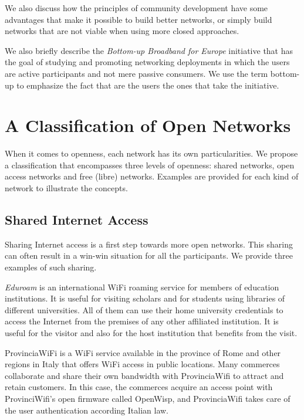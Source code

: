 \documentclass[journal]{IEEEtran}
\begin{document}
We also discuss how the principles of community development have some advantages that make it possible to build better networks, or simply build networks that are not viable when using more closed approaches.


We also briefly describe the \emph{Bottom-up Broadband for Europe} initiative that has the goal of studying and promoting networking deployments in which the users are active participants and not mere passive consumers.
We use the term bottom-up to emphasize the fact that are the users the ones that take the initiative.


\section{A Classification of Open Networks}

When it comes to openness, each network has its own particularities.
We propose a classification that encompasses three levels of openness: shared networks, open access networks and free (libre) networks.
Examples are provided for each kind of network to illustrate the concepts.

\subsection{Shared Internet Access}

Sharing Internet access is a first step towards more open networks.
This sharing can often result in a win-win situation for all the participants.
We provide three examples of such sharing.

\emph{Eduroam} is an international WiFi roaming service for members of education institutions.
It is useful for visiting scholars and for students using libraries of different universities.
All of them can use their home university credentials to access the Internet from the premises of any other affiliated institution.
It is useful for the visitor and also for the host institution that benefits from the visit.

ProvinciaWiFi is a WiFi service available in the province of Rome and other regions in Italy that offers WiFi access in public locations.
Many commerces collaborate and share their own bandwidth with ProvinciaWifi to attract and retain customers.
In this case, the commerces acquire an access point with ProvinciWifi's open firmware called OpenWisp, and ProvinciaWifi takes care of the user authentication according Italian law.
\end{document}
